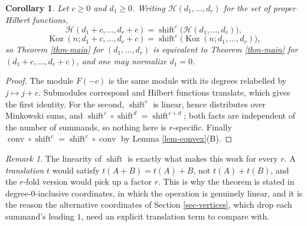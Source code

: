 \documentclass[11pt, a4paper, abstract=yes]{scrartcl}
\theoremstyle{definition}
\theoremstyle{remark}
\newtheorem{remark}[definition]{Remark}
\theoremstyle{plain}
\newtheorem{corollary}[definition]{Corollary}
\newcommand{\Koz}{\operatorname{Koz}}
\newcommand{\shift}{\operatorname{shift}}
\newcommand{\leannone}{\tikz[baseline=-0.6ex]\draw[leannone,line width=0.6pt] (0,0) circle (0.55ex);}
\newcommand{\leanmark}[1]{\leavevmode{\reversemarginpar\marginnote{\raggedleft#1}}}
\newcommand{\conv}{\operatorname{conv}}
\begin{document}
\begin{corollary}
\leanmark{\leannone}Let \(c\ge0\) and \(d_1\ge0\). Writing \(\mathcal H(d_1,\dots,d_r)\) for the set of proper Hilbert
functions,
\begin{equation}\label{eq:normalization}
  \mathcal H(d_1+c,\dots,d_r+c)=\shift^c\bigl(\mathcal H(d_1,\dots,d_r)\bigr),
\end{equation}
\begin{equation}\label{eq:normalization-2}
  \Koz(n;d_1+c,\dots,d_r+c)=\shift^{c}\bigl(\Koz(n;d_1,\dots,d_r)\bigr),
\end{equation}
so Theorem \ref{thm-main} for \((d_1,\dots,d_r)\) is equivalent to Theorem \ref{thm-main} for
\((d_1+c,\dots,d_r+c)\), and one may normalize \(d_1=0\).
\label{cor-normalization}
\end{corollary}

\begin{proof}
The module \(F(-c)\) is the same module with its degrees relabelled by \(j\mapsto j+c\).
Submodules correspond and Hilbert functions translate, which gives the first identity. For the second, \(\shift^c\) is linear,
hence distributes over Minkowski sums, and \(\shift^c\circ\shift^{d}=\shift^{c+d}\); both facts are
independent of the number of summands, so nothing here is \(r\)-specific. Finally
\(\conv\circ\shift^c=\shift^c\circ\conv\) by Lemma \ref{lem-convex}(B).
\end{proof}

\begin{remark}
The linearity of \(\shift\) is exactly what makes this work for every \(r\). A \emph{translation} \(t\)
would satisfy \(t(A+B)=t(A)+B\), not \(t(A)+t(B)\), and the \(r\)-fold version would pick up a factor
\(r\). This is why the theorem is stated in degree-\(0\)-inclusive coordinates, in which the
operation is genuinely linear, and it is the reason the alternative coordinates of
Section \ref{sec-vertices}, which drop each summand's leading \(1\), need an explicit translation
term to compare with.
\label{rem-linearity}
\end{remark}
\end{document}
